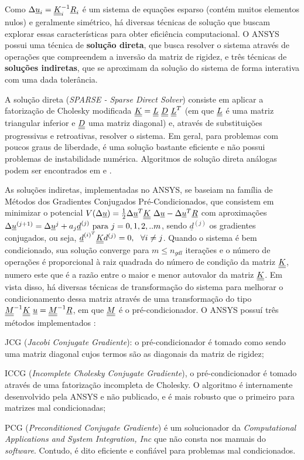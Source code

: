 Como $\Delta \underline u_i = \underline{\underline K}_i^{-1}\underline{R}_i$ é um sistema de equações esparso (contém muitos elementos nulos) e geralmente simétrico, há diversas técnicas de solução que buscam explorar essas características para obter eficiência computacional. O ANSYS possui uma técnica de \textbf{solução direta}, que busca resolver o sistema através de operações que compreendem a inversão da matriz de rigidez, e três técnicas de \textbf{soluções indiretas}, que se aproximam da solução do sistema de forma interativa com uma dada tolerância.

A solução direta (\textit{SPARSE - Sparse Direct Solver}) consiste em aplicar a fatorização de Cholesky modificada $\underline{\underline K} = \underline{\underline L}~\underline{\underline D}~ \underline{\underline L}^T$ (em que $\underline{\underline L}$ é uma matriz triangular inferior e $\underline{\underline D}$ uma matriz diagonal) e, através de substituições progressivas e retroativas, resolver o sistema. Em geral, para problemas com poucos graus de liberdade, é uma solução bastante eficiente e não possui problemas de instabilidade numérica. Algoritmos de solução direta análogas podem ser encontrados em  e .

As soluções indiretas, implementadas no ANSYS, se baseiam na família de Métodos dos Gradientes Conjugados Pré-Condicionados, que consistem em minimizar o potencial $V(\Delta \underline u) = \frac{1}{2}\Delta \underline u^T\underline{\underline K}~\Delta \underline u - \Delta \underline u^T\underline{R}$ com aproximações $\Delta \underline u^{(j+1)}=\Delta \underline u^{j} + a_j \underline{d}^{(j)}~\text{para}~j=0,1,2,..m$, sendo $\underline d^{(j)}$ os gradientes conjugados, ou seja, $\underline {d}^{{(i)}^T} \underline{\underline K} d^{(j)} = 0,~~ \forall i \neq j$. Quando o sistema é bem condicionado, sua solução converge para $m \leq n_{gdl}$ iterações e o número de operações é proporcional à raiz quadrada do número de condição da matriz $\underline{\underline K}$, numero este que é a razão entre o maior e menor autovalor da matriz $\underline{\underline K}$. Em vista disso, há diversas técnicas de transformação do sistema para melhorar o condicionamento dessa matriz através de uma transformação do tipo $\underline{\underline M}^{-1}\underline{\underline K}~\underline u = \underline{\underline M}^{-1} \underline{R}$, em que $\underline{\underline M}$ é o pré-condicionador. O ANSYS possuí três métodos implementados \cite[p. 647]{ANSYS2018}:

\begin{alineas}
	
	\item JCG (\textit{Jacobi Conjugate Gradiente}): o pré-condicionador é tomado como sendo uma matriz diagonal cujos termos são as diagonais da matriz de rigidez;
	
	\item ICCG (\textit{Incomplete Cholesky Conjugate Gradiente}), o pré-condicionador é tomado através de uma fatorização incompleta de Cholesky. O algoritmo é internamente desenvolvido pela ANSYS e não publicado, e é mais robusto que o primeiro para matrizes mal condicionadas;
	
	\item PCG (\textit{Preconditioned Conjugate Gradiente}) é um solucionador da \textit{Computational Applications and System Integration, Inc} que não consta nos manuais do \textit{software}. Contudo, é dito eficiente e confiável para problemas mal condicionados.
	
\end{alineas}

